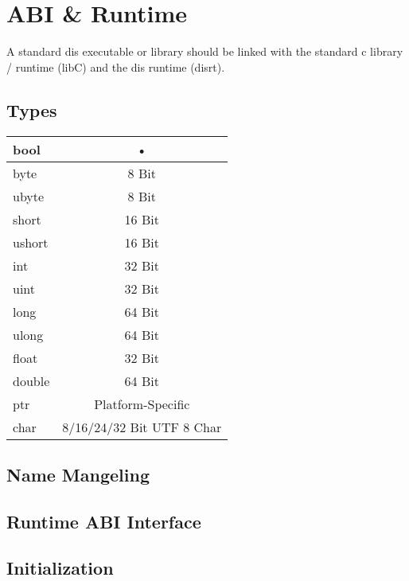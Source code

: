\section{ABI \& Runtime}

A standard dis executable or library should be linked with the standard c library / runtime (libC) and the dis runtime (disrt).

\subsection{Types}
\begin{tabular}{|l|c|}
\hline 
bool    & • \\ \hline 
byte    & 8 Bit \\ \hline
ubyte   & 8 Bit \\ \hline
short   & 16 Bit \\ \hline
ushort  & 16 Bit \\ \hline
int     & 32 Bit \\ \hline
uint    & 32 Bit \\ \hline
long    & 64 Bit \\ \hline
ulong   & 64 Bit \\ \hline
float   & 32 Bit \\ \hline
double  & 64 Bit \\ \hline
ptr     & Platform-Specific \\ \hline
char    & 8/16/24/32 Bit UTF 8 Char \\ \hline
\end{tabular} 

 

\subsection{Name Mangeling}

\subsection{Runtime ABI Interface}

\subsection{Initialization}
